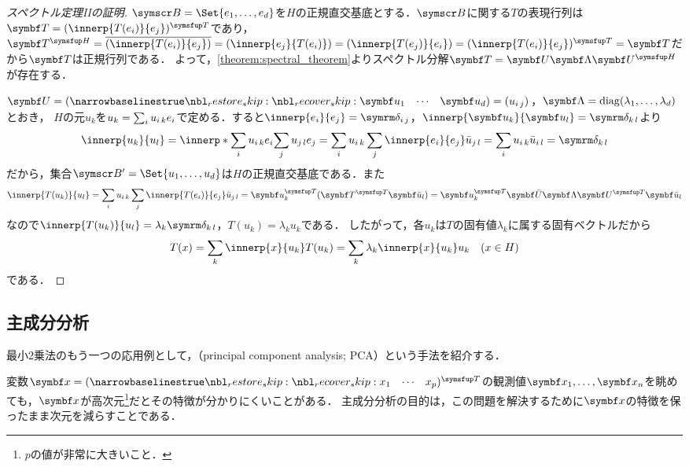 \documentclass[../../main]{subfiles}
\begin{document}
\begin{proof}[スペクトル定理IIの証明]
  \(\basis{B}=\Set{e_1,\dots,e_d}\)を\(H\)の正規直交基底とする．\(\basis{B}\)に関する\(T\)の表現行列は\(\mat{T}=\trps{\matfence{\innerp{T(e_i)}{e_j}}}\)であり，
  \(\htrps{\mat{T}}=\conj*{\matfence{\innerp{T(e_i)}{e_j}}}=\matfence{\innerp{e_j}{T(e_i)}}=\matfence{\innerp{T(e_j)}{e_i}}=\trps{\matfence{\innerp{T(e_i)}{e_j}}}=\mat{T}\)だから\(\mat{T}\)は正規行列である．
  よって，\cref{theorem:spectral_theorem}よりスペクトル分解\(\mat{T}=\mat{U}\mat{\Lambda}\htrps{\mat{U}}\)が存在する．

  \(\mat{U}=\rowvect{\vect{u}_1 & \cdots & \vect{u}_d}=\matfence{\midx{u}{i}{j}}\)，\(\mat{\Lambda}=\diag(\lambda_1,\dots,\lambda_d)\)とおき，
  \(H\)の元\(u_k\)を\(u_k=\sum_iu_{i\,k}e_i\)で定める．すると\(\innerp{e_i}{e_j}=\kdelta{i}{j}\)，\(\innerp{\vect{u}_k}{\vect{u}_l}=\kdelta{k}{l}\)より
  \[
    \innerp{u_k}{u_l} = \innerp*{\sum_i\midx{u}{i}{k}e_i}{\sum_j\midx{u}{j}{l}e_j}
    = \sum_i\midx{u}{i}{k}\sum_j\innerp{e_i}{e_j}\midx{\conj{u}}{j}{l}
    = \sum_i\midx{u}{i}{k}\midx{\conj{u}}{i}{l}
    = \kdelta{k}{l}
  \]
  だから，集合\(\basis{B}'=\Set{u_1,\dots,u_d}\)は\(H\)の正規直交基底である．また
  \[
    \innerp{T(u_k)}{u_l} = \sum_i\midx{u}{i}{k}\sum_j\innerp{T(e_i)}{e_j}\midx{\conj{u}}{j}{l}
    = \trps{\vect{u}_k}(\trps{\mat{T}}\vect{\conj{u}}_l)
    = \trps{\vect{u}_k}\mat{\conj{U}}\mat{\Lambda}\trps{\mat{U}}\vect{\conj{u}}_l
  \]
  なので\(\innerp{T(u_k)}{u_l}=\lambda_k\kdelta{k}{l}\)，\(T(u_k)=\lambda_ku_k\)である．
  したがって，各\(u_k\)は\(T\)の固有値\(\lambda_k\)に属する固有ベクトルだから
  \[
    T(x) = \sum_k\innerp{x}{u_k}T(u_k)
    = \sum_k\lambda_k\innerp{x}{u_k}u_k\quad(x\in H)
  \]
  である．
\end{proof}

\subsection{主成分分析}

最小2乗法のもう一つの応用例として，（principal component analysis; PCA）という手法を紹介する．

変数\(\vect{x}=\trps{\rowvect{x_1 & \cdots & x_p}}\)の観測値\(\vect{x}_1,\dots,\vect{x}_n\)を眺めても，\(\vect{x}\)が高次元\footnote{\(p\)の値が非常に大きいこと．}だとその特徴が分かりにくいことがある．
主成分分析の目的は，この問題を解決するために\(\vect{x}\)の特徴を保ったまま次元を減らすことである．
\end{document}
